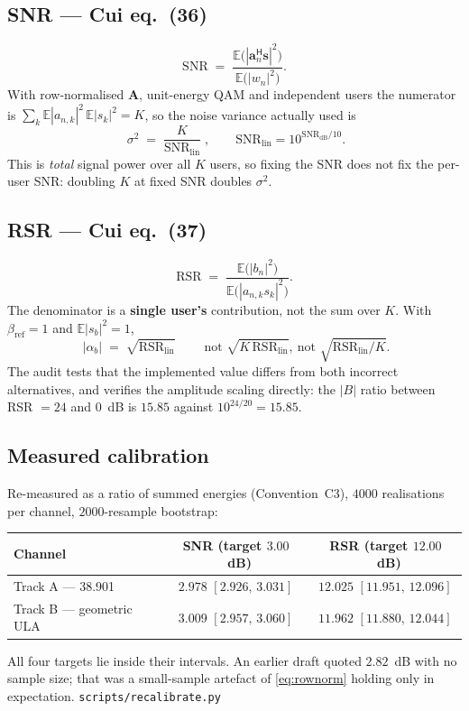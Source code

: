 \documentclass[11pt,a4paper]{article}
\newcommand{\src}[1]{{\footnotesize\color{srcgray}\texttt{#1}}}
\newcommand{\E}{\mathbb{E}}
\newcommand{\herm}{\mathsf{H}}
\newcommand{\mat}[1]{\mathbf{#1}}
\newcommand{\vect}[1]{\mathbf{#1}}
\newcommand{\SNR}{\mathrm{SNR}}
\newcommand{\RSR}{\mathrm{RSR}}
\newcommand{\dB}{\mathrm{dB}}
\newcommand{\lin}{\mathrm{lin}}
\begin{document}
\subsection{SNR --- Cui eq.~(36)}
\begin{equation}
\SNR \;=\;
\frac{\E\bigl(|\vect{a}_n^{\herm}\vect{s}|^2\bigr)}
     {\E\bigl(|w_n|^2\bigr)} .
\label{eq:snr}
\end{equation}
With row-normalised $\mat{A}$, unit-energy QAM and independent users the
numerator is $\sum_k \E|a_{n,k}|^2\,\E|s_k|^2 = K$, so the noise variance
actually used is
\begin{equation}
\boxed{\;\sigma^2 \;=\; \frac{K}{\SNR_{\lin}}\;},
\qquad \SNR_{\lin}=10^{\SNR_{\dB}/10}.
\label{eq:sigma2}
\end{equation}
This is \emph{total} signal power over all $K$ users, so fixing the SNR does
not fix the per-user SNR: doubling $K$ at fixed SNR doubles $\sigma^2$.

\subsection{RSR --- Cui eq.~(37)}
\begin{equation}
\RSR \;=\;
\frac{\E\bigl(|b_n|^2\bigr)}
     {\E\bigl(|a_{n,k}s_k|^2\bigr)} .
\label{eq:rsr}
\end{equation}
The denominator is a \textbf{single user's} contribution, not the sum over
$K$. With $\beta_{\mathrm{ref}}=1$ and $\E|s_b|^2=1$,
\begin{equation}
\boxed{\;|\alpha_b| \;=\; \sqrt{\RSR_{\lin}}\;}
\qquad\text{not } \sqrt{K\,\RSR_{\lin}},\ \text{not } \sqrt{\RSR_{\lin}/K}.
\label{eq:alphab}
\end{equation}
The audit tests that the implemented value differs from both incorrect
alternatives, and verifies the amplitude scaling directly: the $|B|$ ratio
between RSR $=24$ and $0$~dB is $15.85$ against $10^{24/20}=15.85$.

\subsection{Measured calibration}
Re-measured as a ratio of summed energies (Convention~C3), $4000$
realisations per channel, $2000$-resample bootstrap:

\begin{table}[h]\centering
\begin{tabular}{@{}lcc@{}}
\toprule
Channel & SNR (target $3.00$~dB) & RSR (target $12.00$~dB)\\
\midrule
Track A --- 38.901 & $2.978$ $[2.926,\,3.031]$ & $12.025$ $[11.951,\,12.096]$\\
Track B --- geometric ULA & $3.009$ $[2.957,\,3.060]$ & $11.962$ $[11.880,\,12.044]$\\
\bottomrule
\end{tabular}
\end{table}
All four targets lie inside their intervals. An earlier draft quoted
$2.82$~dB with no sample size; that was a small-sample artefact of
\eqref{eq:rownorm} holding only in expectation.
\src{scripts/recalibrate.py}
\end{document}

